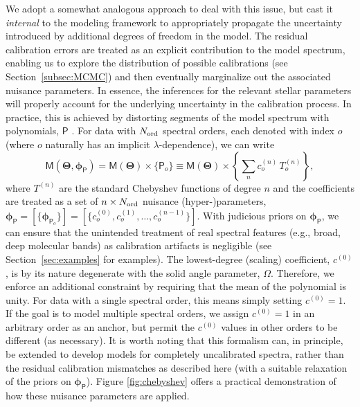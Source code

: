 \documentclass[iop,floatfix]{emulateapj}
\newcommand{\vM}{\mathsf{M}}
\newcommand{\vT}{ {\bm \Theta}}
\newcommand{\vp}{ {\bm \phi}}
\newcommand{\cheb}{ \vp_{\mathsf{P}}}
\begin{document}
We adopt a somewhat analogous approach to deal with this issue, but cast it {\it internal} to the 
modeling framework to appropriately propagate the uncertainty introduced by additional degrees of 
freedom in the model.  The residual calibration errors are treated as an explicit contribution to 
the model spectrum, enabling us to explore the distribution of possible calibrations (see 
Section~\ref{subsec:MCMC}) and then eventually marginalize out the associated nuisance parameters.  
In essence, the inferences for the relevant stellar parameters will properly account for the 
underlying uncertainty in the calibration process.  In practice, this is achieved by distorting 
segments of the model spectrum with polynomials, $\mathsf{P}$ \citep[e.g.,][]{eisenstein06,
koleva09}.  For data with $N_{\rm ord}$ spectral orders, each denoted with index $o$ (where $o$ 
naturally has an implicit $\lambda$-dependence), we can write
\begin{equation}
\vM(\vT, \cheb) = \vM(\vT) \times \{\mathsf{P}_o\} \equiv \vM(\vT) \times \left\{ \sum_n c_o^{(n)} \, T_o^{(n)} \right\},
\label{eqn:chebyshev}
\end{equation}
where $T^{(n)}$ are the standard Chebyshev functions of degree $n$ and the coefficients are treated 
as a set of $n \times N_{\rm ord}$ nuisance (hyper-)parameters, $\cheb = [\{\vp_{\mathsf{P}_o}\}] = 
[\{c_o^{(0)}, c_o^{(1)}, \ldots, c_o^{(n-1)} \}]$.  With judicious priors on $\cheb$, we can ensure 
that the unintended treatment of real spectral features (e.g., broad, deep molecular bands) as 
calibration artifacts is negligible (see Section~\ref{sec:examples} for examples).  The 
lowest-degree (scaling) coefficient, $c^{(0)}$, is by its nature degenerate with the solid angle 
parameter, $\Omega$.  Therefore, we enforce an additional constraint by requiring that the mean of 
the polynomial is unity.  For data with a single spectral order, this means simply setting $c^{(0)} 
= 1$.  If the goal is to model multiple spectral orders, we assign $c^{(0)} = 1$ in an arbitrary 
order as an anchor, but permit the $c^{(0)}$ values in other orders to be different (as 
necessary).  It is worth noting that this formalism can, in principle, be extended to develop 
models for completely uncalibrated spectra, rather than the residual calibration mismatches as 
described here (with a suitable relaxation of the priors on $\cheb$).  Figure \ref{fig:chebyshev} 
offers a practical demonstration of how these nuisance parameters are applied. 
\end{document}
